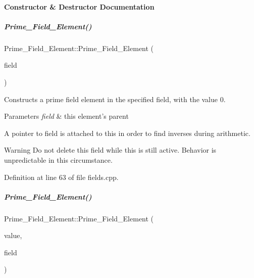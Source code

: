 \paragraph{Constructor \& Destructor Documentation}
\mbox{\label{group___fields_group_a52db0c88a43489efba10059b71d832ec}} 
\subparagraph{\texorpdfstring{Prime\+\_\+\+Field\+\_\+\+Element()}{Prime\_Field\_Element()}\hspace{0.1cm}{\footnotesize\ttfamily [1/2]}}
{\footnotesize\ttfamily Prime\+\_\+\+Field\+\_\+\+Element\+::\+Prime\+\_\+\+Field\+\_\+\+Element (\begin{DoxyParamCaption}\item[{\hyperlink{group___fields_group_class_prime___field}{Prime\+\_\+\+Field} $\ast$}]{field }\end{DoxyParamCaption})}



Constructs a prime field element in the specified field, with the value 0. 


\begin{DoxyParams}{Parameters}
{\em field} & this element's parent\\
\hline
\end{DoxyParams}
A pointer to {\ttfamily field} is attached to {\ttfamily this} in order to find inverses during arithmetic. \begin{DoxyWarning}{Warning}
Do not delete this field while {\ttfamily this} is still active. Behavior is unpredictable in this circumstance. 
\end{DoxyWarning}


Definition at line 63 of file fields.\+cpp.

\mbox{\label{group___fields_group_a6868c9957c5ddb60b2313d51b0565636}} 
\subparagraph{\texorpdfstring{Prime\+\_\+\+Field\+\_\+\+Element()}{Prime\_Field\_Element()}\hspace{0.1cm}{\footnotesize\ttfamily [2/2]}}
{\footnotesize\ttfamily Prime\+\_\+\+Field\+\_\+\+Element\+::\+Prime\+\_\+\+Field\+\_\+\+Element (\begin{DoxyParamCaption}\item[{C\+O\+E\+F\+\_\+\+T\+Y\+PE}]{value,  }\item[{\hyperlink{group___fields_group_class_prime___field}{Prime\+\_\+\+Field} $\ast$}]{field }\end{DoxyParamCaption})}




